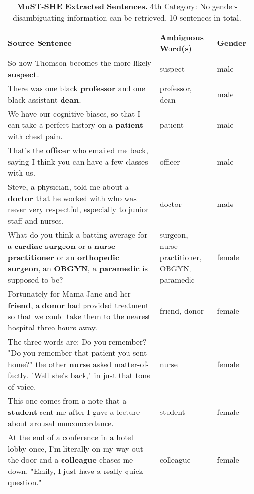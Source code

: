 \begin{table} 
    \begin{tabularx}{\linewidth}{|X|l|l|}
        \hline
        \textbf{Source Sentence} & \textbf{Ambiguous Word(s)} & \textbf{Gender} \\ \hline
        So now Thomson becomes the more likely \textbf{suspect}. & suspect & male \\ \hline
        There was one black \textbf{professor} and one black assistant \textbf{dean}. & professor, dean & male \\ \hline
        We have our cognitive biases, so that I can take a perfect history on a \textbf{patient} with chest pain. & patient & male \\ \hline
        That's the \textbf{officer} who emailed me back, saying I think you can have a few classes with us.  & officer & male \\ \hline
        Steve, a physician, told me about a \textbf{doctor} that he worked with who was never very respectful, especially to junior staff and nurses. & doctor & male \\ \hline
        What do you think a batting average for a \textbf{cardiac surgeon} or a \textbf{nurse practitioner} or an \textbf{orthopedic surgeon}, an \textbf{OBGYN}, a \textbf{paramedic} is supposed to be? & \makecell[l]{surgeon, \\ nurse practitioner, \\ OBGYN, paramedic} & female \\ \hline
        Fortunately for Mama Jane and her \textbf{friend}, a \textbf{donor} had provided treatment so that we could take them to the nearest hospital three hours away. & friend, donor & female \\ \hline
        The three words are: Do you remember? "Do you remember that patient you sent home?" the other \textbf{nurse} asked matter-of-factly. "Well she's back," in just that tone of voice. & nurse & female \\ \hline
        This one comes from a note that a \textbf{student} sent me after I gave a lecture about arousal nonconcordance. & student & female \\ \hline
        At the end of a conference in a hotel lobby once, I'm literally on my way out the door and a \textbf{colleague} chases me down. "Emily, I just have a really quick question."  & colleague & female \\ \hline
    \end{tabularx}
    \caption{\textbf{MuST-SHE Extracted Sentences.} 4th Category: No gender-disambiguating information can be retrieved. 10 sentences in total.}
    \label{tab:mustshe_sentences}
\end{table}


